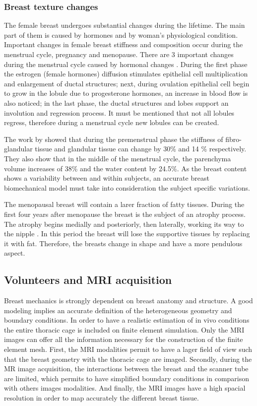 \subsubsection*{Breast texture changes}
The female breast undergoes substantial changes during the lifetime.  The main part of them is caused by hormones and by woman's physiological condition. Important changes in female breast stiffness and composition occur during the menstrual cycle, pregnancy and menopause. 
There are 3 important changes during the menstrual cycle caused by hormonal changes \cite{valerie_mammographic_2011}. During the first phase the estrogen (female hormones) diffusion stimulates epithelial cell multiplication and enlargement of ductal structures; next, during ovulation epithelial cell begin to grow in the lobule due to progesterone hormones, an increase in blood flow is also noticed; in the last phase, the ductal structures and lobes support an involution and regression process. It must be mentioned that not all lobules regress, therefore during a menstrual cycle new lobules can be created.  

The work by \cite{lorenzen_menstrual-cycle_2003} showed that during the premenstrual phase the stiffness of fibro-glandular tissue and glandular tissue can change by 30\% and 14 \% respectively. They also show that in the middle of the  menstrual cycle, the parenchyma volume increases of 38\% and the water content by 24.5\%. As the breast content shows a variability between and within subjects, an accurate breast biomechanical model must take into consideration the subject specific variations. 

The menopausal breast will contain a larer fraction of fatty tissues. During the first four years after menopause the breast is the subject of an atrophy process. The atrophy begins medially and posteriorly, then laterally, working its way to the nipple \cite{valerie_mammographic_2011}. In this period the breast will lose the supportive tissues by replacing it with fat. Therefore, the breasts change in shape and have a more pendulous aspect.


\subsection{Volunteers and MRI acquisition}
Breast mechanics is strongly dependent on breast anatomy and structure. A good modeling implies an accurate definition of the heterogeneous geometry and boundary conditions. In order to have a realistic estimation of in vivo conditions the entire thoracic cage is included on finite element simulation. Only the MRI images can offer all the information necessary for the construction of the finite element mesh. First, the MRI modalities permit to have a lager field of view such that the breast geometry with the thoracic cage are imaged. Secondly, during the MR image acquisition, the interactions between the breast and the scanner tube are limited, which permits to have simplified boundary conditions in comparison with others images modalities. And finally, the MRI images have a high spacial resolution in order to map accurately the different breast tissue.
     
